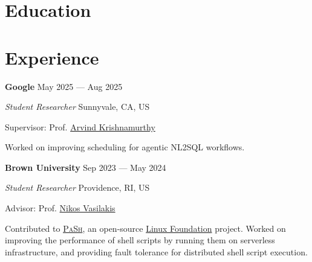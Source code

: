 \documentclass[margin,12pt]{resume}
\newcommand{\descriptionVSpace}{\vspace{0.5ex}\xspace}
\newcommand{\subsectionVSpace}{\vspace{3.5ex}\xspace}
\newcommand{\sectionVSpace}{\vspace{1ex}\xspace} %
\newcommand{\pash}{\textsc{PaSh}\xspace}
\newcommand{\sectionVSpaceCorrection}{\vspace{-3.5ex}} %
\newcommand{\header}[1]{\textbf{#1}\xspace}
\newcommand{\company}[1]{\header{#1}\xspace}
\newcommand{\interval}[2]{#1 --- #2\xspace}
\newcommand{\place}[1]{#1\xspace}
\newcommand{\role}[1]{\textit{#1}\xspace}
\newcommand{\stitle}[1]{#1:\xspace}
\newenvironment{rSubsection}{}{\par\subsectionVSpace}
\newenvironment{rSection}[1]{\sectionVSpaceCorrection\section{#1}\xspace}{\sectionVSpace\par}
\newenvironment{jobDuties}{\descriptionVSpace}{\par}
\begin{document}
\begin{resume}
\begin{rSection}{Education}
\begin{rSubsection}
		\end{rSubsection}
	\end{rSection}

	\begin{rSection}{Experience}
		\begin{rSubsection}
			\company{Google} \hfill \interval{May 2025}{Aug 2025}

			\role{Student Researcher} \hfill \place{Sunnyvale, CA, US}

			\stitle{Supervisor} Prof. \href{https://sites.google.com/cs.washington.edu/arvind}{Arvind Krishnamurthy}

			\begin{jobDuties}
				Worked on improving scheduling for agentic NL2SQL workflows.
			\end{jobDuties}
		\end{rSubsection}

		\begin{rSubsection}
			\company{Brown University} \hfill \interval{Sep 2023}{May 2024}

			\role{Student Researcher} \hfill \place{Providence, RI, US}

			\stitle{Advisor} Prof. \href{https://nikos.vasilak.is}{Nikos Vasilakis}

			\begin{jobDuties}
				Contributed to \href{https://binpa.sh}{\pash}, an open-source \href{https://www.linuxfoundation.org/press/press-release/linux-foundation-to-host-the-pash-project-accelerating-shell-scripting-with-automated-parallelization-for-industrial-use-cases}{Linux Foundation} project.
				Worked on improving the performance of shell scripts by running them on serverless infrastructure, and providing fault tolerance for distributed shell script execution.
			\end{jobDuties}
		\end{rSubsection}






\end{rSection}
\end{resume}
\end{document}
